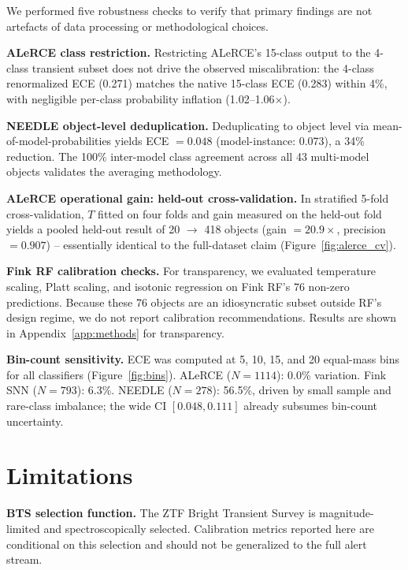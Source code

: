 \documentclass[a4paper,fleqn,usenatbib]{mnras}
\begin{document}
We performed five robustness checks to verify that primary
findings are not artefacts of data processing or methodological
choices.

\textbf{ALeRCE class restriction.} Restricting ALeRCE's 15-class
output to the 4-class transient subset does not drive the observed
miscalibration: the 4-class renormalized ECE (0.271) matches the
native 15-class ECE (0.283) within 4\%, with negligible per-class
probability inflation (1.02--1.06$\times$).

\textbf{NEEDLE object-level deduplication.} Deduplicating to
object level via mean-of-model-probabilities yields ECE $= 0.048$
(model-instance: 0.073), a 34\% reduction. The 100\% inter-model
class agreement across all 43 multi-model objects validates the
averaging methodology.

\textbf{ALeRCE operational gain: held-out cross-validation.}
In stratified 5-fold cross-validation, $T$ fitted on four folds
and gain measured on the held-out fold yields a pooled held-out
result of 20 $\to$ 418 objects (gain $= 20.9\times$, precision
$= 0.907$) -- essentially identical to the full-dataset claim
(Figure~\ref{fig:alerce_cv}).

\textbf{Fink RF calibration checks.} For transparency, we
evaluated temperature scaling, Platt scaling, and isotonic
regression on Fink RF's 76 non-zero predictions. Because these
76 objects are an idiosyncratic subset outside RF's design regime,
we do not report calibration recommendations. Results are shown in
Appendix~\ref{app:methods} for transparency.

\textbf{Bin-count sensitivity.} ECE was computed at 5, 10, 15,
and 20 equal-mass bins for all classifiers
(Figure~\ref{fig:bins}). ALeRCE ($N = 1114$): 0.0\% variation.
Fink SNN ($N = 793$): 6.3\%. NEEDLE ($N = 278$): 56.5\%, driven
by small sample and rare-class imbalance; the wide CI
$[0.048, 0.111]$ already subsumes bin-count uncertainty.


\section{Limitations} \label{sec:limitations}

\textbf{BTS selection function.} The ZTF Bright Transient Survey
is magnitude-limited and spectroscopically selected. Calibration
metrics reported here are conditional on this selection and should
not be generalized to the full alert stream.
\end{document}
